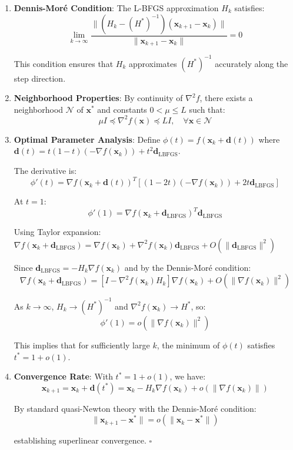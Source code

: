 \begin{enumerate}
\def\labelenumi{\arabic{enumi}.}
\item
  \textbf{Dennis-Moré Condition}: The L-BFGS approximation \(H_k\) satisfies:
  \[\lim_{k \to \infty} \frac{\|(H_k - (H^*)^{-1})(\mathbf{x}_{k+1} - \mathbf{x}_k)\|}{\|\mathbf{x}_{k+1} - \mathbf{x}_k\|} = 0\]

  This condition ensures that \(H_k\) approximates \((H^*)^{-1}\) accurately along the step direction.
\item
  \textbf{Neighborhood Properties}: By continuity of \(\nabla^2 f\), there exists a neighborhood \(\mathcal{N}\) of \(\mathbf{x}^*\) and constants \(0 < \mu \leq L\) such that:
  \[\mu I \preceq \nabla^2 f(\mathbf{x}) \preceq L I, \quad \forall \mathbf{x} \in \mathcal{N}\]
\item
  \textbf{Optimal Parameter Analysis}: Define \(\phi(t) = f(\mathbf{x}_k + \mathbf{d}(t))\) where \(\mathbf{d}(t) = t(1-t)(-\nabla f(\mathbf{x}_k)) + t^2\mathbf{d}_{\text{LBFGS}}\).

  The derivative is:
  \[\phi'(t) = \nabla f(\mathbf{x}_k + \mathbf{d}(t))^T[(1-2t)(-\nabla f(\mathbf{x}_k)) + 2t\mathbf{d}_{\text{LBFGS}}]\]

  At \(t = 1\):
  \[\phi'(1) = \nabla f(\mathbf{x}_k + \mathbf{d}_{\text{LBFGS}})^T \mathbf{d}_{\text{LBFGS}}\]

  Using Taylor expansion: \(\nabla f(\mathbf{x}_k + \mathbf{d}_{\text{LBFGS}}) = \nabla f(\mathbf{x}_k) + \nabla^2 f(\mathbf{x}_k)\mathbf{d}_{\text{LBFGS}} + O(\|\mathbf{d}_{\text{LBFGS}}\|^2)\)

  Since \(\mathbf{d}_{\text{LBFGS}} = -H_k\nabla f(\mathbf{x}_k)\) and by the Dennis-Moré condition:
  \[\nabla f(\mathbf{x}_k + \mathbf{d}_{\text{LBFGS}}) = [I - \nabla^2 f(\mathbf{x}_k)H_k]\nabla f(\mathbf{x}_k) + O(\|\nabla f(\mathbf{x}_k)\|^2)\]

  As \(k \to \infty\), \(H_k \to (H^*)^{-1}\) and \(\nabla^2 f(\mathbf{x}_k) \to H^*\), so:
  \[\phi'(1) = o(\|\nabla f(\mathbf{x}_k)\|^2)\]

  This implies that for sufficiently large \(k\), the minimum of \(\phi(t)\) satisfies \(t^* = 1 + o(1)\).
\item
  \textbf{Convergence Rate}: With \(t^* = 1 + o(1)\), we have:
  \[\mathbf{x}_{k+1} = \mathbf{x}_k + \mathbf{d}(t^*) = \mathbf{x}_k - H_k\nabla f(\mathbf{x}_k) + o(\|\nabla f(\mathbf{x}_k)\|)\]

  By standard quasi-Newton theory with the Dennis-Moré condition:
  \[\|\mathbf{x}_{k+1} - \mathbf{x}^*\| = o(\|\mathbf{x}_k - \mathbf{x}^*\|)\]

  establishing superlinear convergence. \(\square\)
\end{enumerate}

